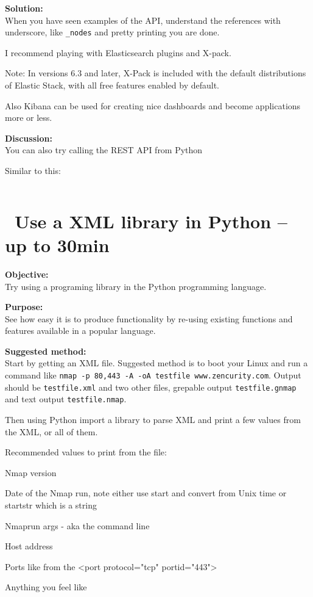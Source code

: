 \documentclass[a4paper,11pt,notitlepage]{report}
\begin{document}
{\bf Solution:}\\
When you have seen examples of the API, understand the references with underscore, like \verb+_nodes+ and pretty printing you are done.

I recommend playing with Elasticsearch plugins and X-pack.\\

Note: In versions 6.3 and later, X-Pack is included with the default distributions of Elastic Stack, with all free features enabled by default.

Also Kibana can be used for creating nice dashboards and become applications more or less.

{\bf Discussion:}\\
You can also try calling the REST API from Python

Similar to this:
\inputminted{python}{programs/rest-1.py}








\chapter{\faInfoCircle\ Use a XML library in Python -- up to 30min}
\label{ex-python-library}

{\bf Objective:}\\
Try using a programing library in the Python programming language.

{\bf Purpose:}\\
See how easy it is to produce functionality by re-using existing functions and features available in a popular language.

{\bf Suggested method:}\\
Start by getting an XML file. Suggested method is to boot your Linux and run a command like \verb+nmap -p 80,443 -A -oA testfile www.zencurity.com+. Output should be \verb+testfile.xml+ and two other files, grepable output \verb+testfile.gnmap+ and text output \verb+testfile.nmap+.

Then using Python import a library to parse XML and print a few values from the XML, or all of them.

Recommended values to print from the file:
\begin{list2}
\item Nmap version
\item Date of the Nmap run, note either use start and convert from Unix time or startstr which is a string
\item Nmaprun args - aka the command line
\item Host address
\item Ports like from the <port protocol="tcp" portid="443">
\item Anything you feel like
\end{list2}
\end{document}

